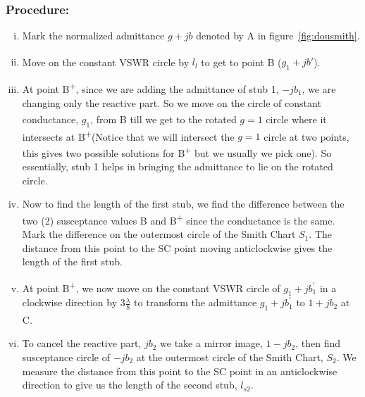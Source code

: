 \subsubsection*{Procedure:}
\begin{enumerate}[(i)]
\item Mark the normalized admittance $g + jb$ denoted by A in figure~\ref{fig:dousmith}.
\item Move on the constant VSWR circle by $l_l$ to get to point B\textsuperscript{\textemdash} ($g_1 + jb'$).
\item At point B\textsuperscript{+}, since we are adding the admittance of stub 1, $-jb_{1}$, we are changing only the reactive part. So we move on the circle of constant conductance, $g_1$, from B\textsuperscript{\textemdash} till we get to the rotated $g = 1$ circle where it intersects at B\textsuperscript{+}(Notice that we will intersect the $g = 1$ circle at two points, this gives two possible solutions for B\textsuperscript{+} but we usually we pick one). So essentially, stub 1 helps in bringing the admittance to lie on the rotated circle.
\item Now to find the length of the first stub, we find the difference between the two (2) susceptance values B\textsuperscript{\textemdash} and B\textsuperscript{+} since the conductance is the same. Mark the difference on the outermost circle of the Smith Chart $S_1$. The distance from this point to the SC point moving anticlockwise gives the length of the first stub.
\item At point B\textsuperscript{+}, we now move on the constant VSWR circle of $g_{1} + jb_1^{'}$ in a clockwise direction by $ 3\frac{\lambda}{8}$ to transform the admittance $g_1 + jb_1^{'}$ to $1 + jb_2$ at C\textsuperscript{\textemdash}.
\item To cancel the reactive part, $jb_2$ we take a mirror image, $1-jb_2$, then find susceptance circle of $-jb_2$ at the outermost circle of the Smith Chart, $S_2$. We measure the distance from this point to the SC point in an anticlockwise direction to give us the length of the second stub, $l_{s2}$.
\end{enumerate}

